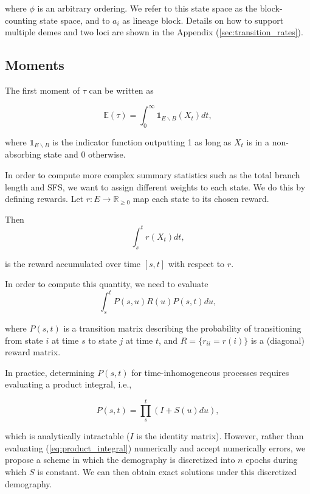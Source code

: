 \documentclass[hidelinks,11pt]{article}
\begin{document}
where $\phi$ is an arbitrary ordering. We refer to this state space as the block-counting state space, and to $a_i$ as lineage block. Details on how to support multiple demes and two loci are shown in the Appendix (\ref{sec:transition_rates}).

\subsection{Moments}

The first moment of $\tau$ can be written as 

\begin{equation*}
\mathds{E}(\tau) = \int_0^{\infty} \mathds{1}_{E \backslash B}(X_t) dt,
\end{equation*}

where $\mathds{1}_{E \backslash B}$ is the indicator function outputting 1 as long as $X_t$ is in a non-absorbing state and 0 otherwise.

In order to compute more complex summary statistics such as the total branch length and SFS, we want to assign different weights to each state. We do this by defining rewards. Let $r: E \rightarrow \mathbb{R}_{\geq 0}$ map each state to its chosen reward.

Then
\begin{equation*}
\int_s^{t} r(X_t) dt,
\end{equation*}

is the reward accumulated over time $[s, t]$ with respect to $r$. 

In order to compute this quantity, we need to evaluate
\begin{equation}\label{eq:reward_integral}
\int_s^t P(s,u)R(u)P(s,t) du,
\end{equation}

where $P(s,t)$ is a transition matrix describing the probability of transitioning from state $i$ at time $s$ to state $j$ at time $t$, and $R=\{r_{ii}=r(i)\}$ is a (diagonal) reward matrix.

In practice, determining $P(s,t)$ for time-inhomogeneous processes requires evaluating a product integral, i.e.,

\begin{equation}\label{eq:product_integral}
P(s,t) = \prod_s^t (I + S(u) du),
\end{equation}

which is analytically intractable ($I$ is the identity matrix). However, rather than evaluating (\ref{eq:product_integral}) numerically and accept numerically errors, we propose a scheme in which the demography is discretized into $n$ epochs during which $S$ is constant. We can then obtain exact solutions under this discretized demography.
\end{document}
